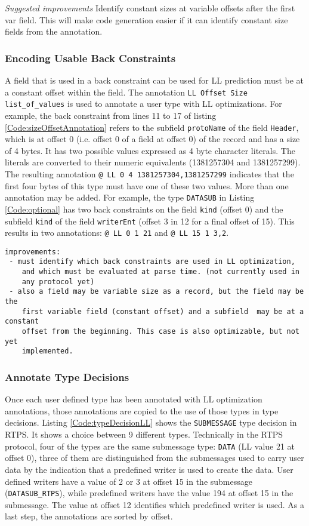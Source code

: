 \documentclass[12pt,oneside,letterpaper]{article}
\begin{document}
\emph{Suggested improvements} Identify constant sizes at variable offsets after the first var field.  This will make code generation easier if it can
identify constant size fields from the annotation.

\subsubsection{Encoding Usable Back Constraints}
A field that is used in a back constraint can be used for LL prediction must be at a constant offset within the field. The annotation \texttt{LL Offset Size list\_of\_values} is used to annotate a user type with LL optimizations. For example, the back constraint from lines 11 to 17 of listing \ref{Code:sizeOffsetAnnotation} refers to the subfield \texttt{protoName} of the field \texttt{Header}, which is at offset 0 (i.e. offset 0 of a field at offset 0) of the record and has a size of 4 bytes. It has two possible values expressed as 4 byte character literals. The literals are converted to their numeric equivalents (1381257304 and 1381257299). The resulting annotation  \texttt{@ LL 0 4 1381257304,1381257299} indicates that the first four bytes of this type must have one of these two values. More than one annotation may be added. For example, the type \texttt{DATASUB} in Listing \ref{Code:optional} has two back constraints on the field \texttt{kind} (offset 0) and the subfield \texttt{kind} of the field \texttt{writerEnt} (offset 3 in 12 for a final offset of 15). This results in two annotations: \texttt{@ LL 0 1 21} and \texttt{@ LL 15 1 3,2}.

\begin{verbatim}
improvements: 
 - must identify which back constraints are used in LL optimization,
    and which must be evaluated at parse time. (not currently used in
    any protocol yet)
 - also a field may be variable size as a record, but the field may be the
    first variable field (constant offset) and a subfield  may be at a constant 
    offset from the beginning. This case is also optimizable, but not yet
    implemented.
\end{verbatim}

\subsubsection{Annotate Type Decisions}
Once each user defined type has been annotated with LL optimization annotations, those annotations are copied to the use of those types in type decisions. Listing \ref{Code:typeDecisionLL} shows the \texttt{SUBMESSAGE} type decision in RTPS. It shows a choice between 9 different types. Technically in the RTPS protocol, four of the types are the same submessage type: \texttt{DATA} (LL value 21 at offset 0), three of them are distinguished from the submessages used to carry user data by the indication that a predefined writer is used to create the data.  User defined writers have a value of 2 or 3 at offset 15 in the submessage (\texttt{DATASUB\_RTPS}), while predefined writers have the value 194 at offset 15 in the submessage. The value at offset 12 identifies which predefined writer is used. As a last step, the annotations are sorted by offset.
\end{document}
